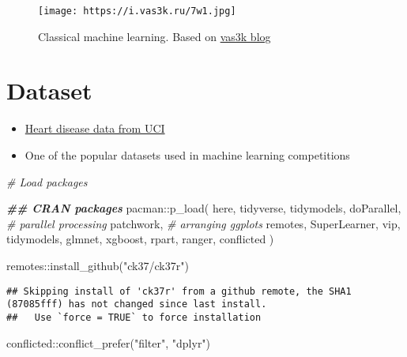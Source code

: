 \documentclass[
]{book}
\newenvironment{Shaded}{\begin{snugshade}}{\end{snugshade}}
\newcommand{\CommentTok}[1]{\textcolor[rgb]{0.56,0.35,0.01}{\textit{#1}}}
\newcommand{\DocumentationTok}[1]{\textcolor[rgb]{0.56,0.35,0.01}{\textbf{\textit{#1}}}}
\newcommand{\FunctionTok}[1]{\textcolor[rgb]{0.00,0.00,0.00}{#1}}
\newcommand{\NormalTok}[1]{#1}
\newcommand{\SpecialCharTok}[1]{\textcolor[rgb]{0.00,0.00,0.00}{#1}}
\newcommand{\StringTok}[1]{\textcolor[rgb]{0.31,0.60,0.02}{#1}}
\begin{document}
\begin{figure}
\centering
\texttt{[image: https://i.vas3k.ru/7w1.jpg]}
\caption{Classical machine learning. Based on \href{https://vas3k.com/blog/machine_learning/}{vas3k blog}}
\end{figure}

\hypertarget{dataset}{%
\section{Dataset}\label{dataset}}

\begin{itemize}
\item
  \href{https://archive.ics.uci.edu/ml/datasets/heart+Disease}{Heart disease data from UCI}
\item
  One of the popular datasets used in machine learning competitions
\end{itemize}

\begin{Shaded}
\begin{Highlighting}[]
\CommentTok{\# Load packages}

\DocumentationTok{\#\# CRAN packages}
\NormalTok{pacman}\SpecialCharTok{::}\FunctionTok{p\_load}\NormalTok{(}
\NormalTok{  here,}
\NormalTok{  tidyverse,}
\NormalTok{  tidymodels,}
\NormalTok{  doParallel, }\CommentTok{\# parallel processing}
\NormalTok{  patchwork, }\CommentTok{\# arranging ggplots}
\NormalTok{  remotes,}
\NormalTok{  SuperLearner,}
\NormalTok{  vip,}
\NormalTok{  tidymodels,}
\NormalTok{  glmnet,}
\NormalTok{  xgboost,}
\NormalTok{  rpart,}
\NormalTok{  ranger,}
\NormalTok{  conflicted}
\NormalTok{)}

\NormalTok{remotes}\SpecialCharTok{::}\FunctionTok{install\_github}\NormalTok{(}\StringTok{"ck37/ck37r"}\NormalTok{)}
\end{Highlighting}
\end{Shaded}

\begin{verbatim}
## Skipping install of 'ck37r' from a github remote, the SHA1 (87085fff) has not changed since last install.
##   Use `force = TRUE` to force installation
\end{verbatim}

\begin{Shaded}
\begin{Highlighting}[]
\NormalTok{conflicted}\SpecialCharTok{::}\FunctionTok{conflict\_prefer}\NormalTok{(}\StringTok{"filter"}\NormalTok{, }\StringTok{"dplyr"}\NormalTok{)}
\end{Highlighting}
\end{Shaded}
\end{document}
